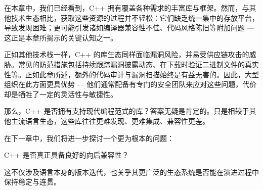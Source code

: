 在本章中，我们已经看到，C++ 拥有覆盖各种需求的丰富库与框架。然而，与其他技术生态相比，获取这些资源的过程并不轻松：它们缺乏统一集中的存放平台，导致发现困难；更可能引发诸如编译器兼容性不佳、代码风格陈旧等附加问题 --- 这正是本章所揭示的关键认知之一。

正如其他技术栈一样，C++ 的库生态同样面临漏洞风险，并易受供应链攻击的威胁。常见的防范措施包括持续跟踪漏洞披露动态、在下载时验证二进制文件的真实性等。正如此章所述，额外的代码审计与漏洞扫描始终是有益无害的。因此，大型组织在此方面更具优势 --- 他们通常配备有专门的安全团队来应对这些问题，代价却是牺牲了一定的灵活性与敏捷性。

那么，C++ 是否拥有支持现代编程范式的库？答案无疑是肯定的。只是相较于其他主流语言生态，这些库往往更难发现、更难集成、兼容性更差。

在下一章中，我们将进一步探讨一个更为根本的问题：

C++ 是否真正具备良好的向后兼容性？

这不仅涉及语言本身的版本迭代，也关乎其更广泛的生态系统是否能在演进过程中保持稳定与连贯。